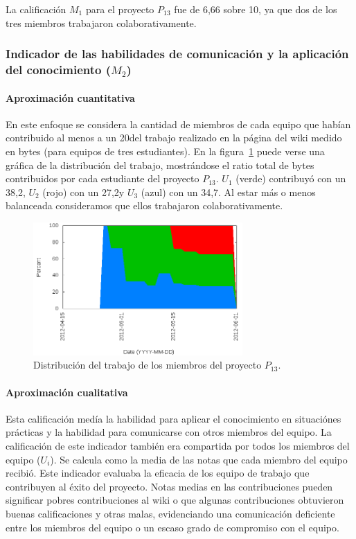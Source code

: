 La calificación $M_1$ para el proyecto $P_{13}$ fue de 6,66 sobre 10, ya que dos de los tres miembros trabajaron colaborativamente.

\subsubsection{Indicador de las habilidades de comunicación y la aplicación del conocimiento ($M_2$)}

\paragraph*{Aproximación cuantitativa}

En este enfoque se considera la cantidad de miembros de cada equipo que habían contribuido al menos a un 20\percentage del trabajo realizado en la página del wiki medido en bytes (para equipos de tres estudiantes). En la figura~\ref{fig:smw-p13} puede verse una gráfica de la distribución del trabajo, mostrándose el ratio total de bytes contribuidos por cada estudiante del proyecto $P_{13}$. $U_1$ (verde) contribuyó con un 38,2\percentage, $U_2$ (rojo) con un 27,2\percentage y $U_3$ (azul) con un 34,7\percentage. Al estar más o menos balanceada consideramos que ellos trabajaron colaborativamente.

\begin{figure}
	\centering
	\includegraphics[width=8cm]{smw-work-distribution-p13.png}
	\caption{Distribución del trabajo de los miembros del proyecto $P_{13}$.}
	\label{fig:smw-p13}
\end{figure}

\paragraph*{Aproximación cualitativa}

Esta calificación medía la habilidad para aplicar el conocimiento en situaciónes prácticas y la habilidad para comunicarse con otros miembros del equipo. La calificación de este indicador también era compartida por todos los miembros del equipo ($U_i$). Se calcula como la media de las notas que cada miembro del equipo recibió. Este indicador evaluaba la eficacia de los equipo de trabajo que contribuyen al éxito del proyecto. Notas medias en las contribuciones pueden significar pobres contribuciones al wiki o que algunas contribuciones obtuvieron buenas calificaciones y otras malas, evidenciando una comunicación deficiente entre los miembros del equipo o un escaso grado de compromiso con el equipo.

